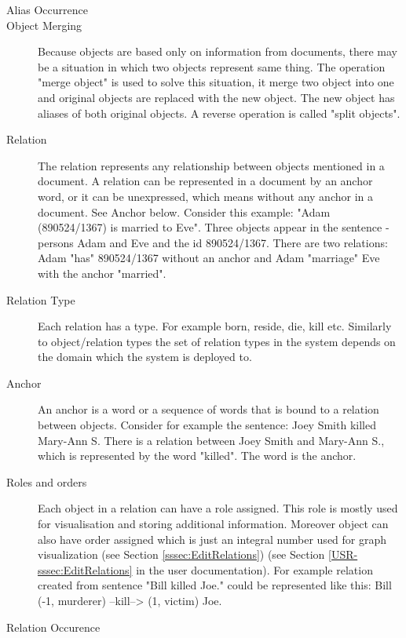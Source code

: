 \begin{description}
\item[Alias Occurrence]

\item[Object Merging]
Because objects are based only on information from documents, there may be a situation
in which two objects represent same thing. The operation "merge object" is used
to solve this situation, it merge two object into one and original objects are
replaced with the new object. The new object has aliases of both original objects.
A reverse operation is called "split objects".

\item[Relation]
The relation represents any relationship between objects mentioned in a document.
A relation can be represented in a document by an anchor word, or it can be
unexpressed, which means without any anchor in a document. See Anchor below.
Consider this example: "Adam (890524/1367) is married to Eve". Three objects
appear in the sentence - persons Adam and Eve and the id 890524/1367. There
are two relations: Adam "has" 890524/1367 without an anchor and Adam "marriage"
Eve with the anchor "married".

\item[Relation Type]
Each relation has a type. For example born, reside, die, kill etc. Similarly to
object/relation types the set of relation types in the system depends on the
domain which the system is deployed to.

\item[Anchor]
An anchor is a word or a sequence of words that is bound to a relation between
objects. Consider for example the sentence: Joey Smith killed Mary-Ann S. There
is a relation between Joey Smith and Mary-Ann S., which is represented by the
word "killed". The word is the anchor.

\item[Roles and orders]
Each object in a relation can have a role assigned. This role is mostly used
for visualisation and storing additional information. Moreover object can also
have order assigned which is just an integral number used for graph
visualization\ifdefined\USRDOC{} (see Section \ref{sssec:EditRelations})\fi{}
\ifdefined\DEVDOC{} (see Section \ref{USR-sssec:EditRelations} in the user
documentation)\fi{}. For example relation created from sentence
"Bill killed Joe." could be represented like this:
Bill (-1, murderer) --kill--> (1, victim) Joe.

\item[Relation Occurence]
\end{description}

